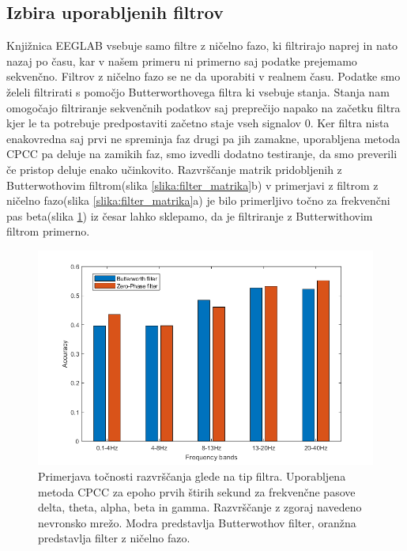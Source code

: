 \newpage
\subsection{Izbira uporabljenih filtrov}
Knjižnica EEGLAB vsebuje samo filtre z ničelno fazo, ki filtrirajo naprej in nato nazaj po času, kar v našem primeru ni primerno saj podatke prejemamo sekvenčno. Filtrov z ničelno fazo se ne da uporabiti v realnem času. Podatke smo želeli filtrirati s pomočjo Butterworthovega filtra ki vsebuje stanja. Stanja nam omogočajo filtriranje sekvenčnih podatkov saj preprečijo napako na začetku filtra kjer le ta potrebuje predpostaviti začetno staje vseh signalov 0. Ker filtra nista enakovredna saj prvi ne spreminja faz drugi pa jih zamakne, uporabljena metoda CPCC pa deluje na zamikih faz, smo izvedli dodatno testiranje, da smo preverili če pristop deluje enako učinkovito. Razvrščanje matrik pridobljenih z Butterwothovim filtrom(slika \ref{slika:filter_matrika}b) v primerjavi z filtrom z ničelno fazo(slika \ref{slika:filter_matrika}a) je bilo primerljivo točno za frekvenčni pas beta(slika \ref{slika:primerjava_filtrov}) iz česar lahko sklepamo, da je filtriranje z Butterwithovim filtrom primerno.
\begin{figure}
    \begin{center}
    \includegraphics[width=1 \linewidth]{slike/ComparisonFilters.png}
    \end{center}
    \caption[Točnost razvrščanja glede na tip filtra in frekvenčno območe.]{Primerjava točnosti razvrščanja glede na tip filtra. Uporabljena metoda CPCC za epoho prvih štirih sekund za frekvenčne pasove delta, theta, alpha, beta in gamma. Razvrščanje z zgoraj navedeno nevronsko mrežo. Modra predstavlja Butterwothov filter, oranžna predstavlja filter z ničelno fazo.}
    \label{slika:primerjava_filtrov}
\end{figure}

